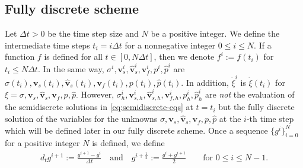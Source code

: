 \documentclass[10pt,letterpaper]{amsart}
\theoremstyle{plain} %
\theoremstyle{remark} %
\newcommand{\vect}[1]{\mathbf{#1}}
\begin{document}
\subsection{Fully discrete scheme}\label{ss:fully_discrete_scheme}
Let $\Delta t>0$ be the time step size and $N$ be a positive integer. We define the intermediate time steps $t_i = i \Delta t$ for a nonnegative integer $0\le i\le N$. If a function $f$ is defined for all $t\in[0,N\Delta t]$, then we denote $f^i:= f(t_i)$ for $t_i \le N\Delta t$. In the same way, $\sigma^{i}, \vect{v}_{s}^{i}, \widehat{\vect{v}}_{s}^{i}, \vect{v}_{f}^{i}, p^{i}, \widehat{p}^{i}$ are $\sigma(t_i), \vect{v}_{s}(t_i), \widehat{\vect{v}}_{s}(t_i), \vect{v}_{f}(t_i), p(t_i), \widehat{p}(t_i)$. In addition, $\dot{\xi}^i$ is $\dot{\xi}(t_i)$ for $\xi = \sigma, \vect{v}_{s}, \widehat{\vect{v}}_{s}, \vect{v}_{f}, p, \widehat{p}$. 
{However, $\sigma_h^{i}, \vect{v}_{s,h}^{i}, \widehat{\vect{v}}_{s,h}^{i}, \vect{v}_{f,h}^{i}, p_h^{i}, \widehat{p}_h^{i}$ are {\it not} the evaluation of the semidiscrete solutions in \eqref{eq:semidiscrete-eqs} at $t=t_i$ but the fully discrete solution of the variables for the unknowns $\sigma, \vect{v}_{s}, \widehat{\vect{v}}_{s}, \vect{v}_{f}, p, \widehat{p}$ at the $i$-th time step which will be defined later in our fully discrete scheme.}
Once a sequence $\{g^i\}_{i=0}^{N}$ for a positive integer $N$ is defined, we define 
%
\begin{align}
	\label{time-quotient}
	d_t g^{i+1} := \frac{g^{i+1} - g^{i}}{\Delta t} \quad \text{and} \quad {g}^{i+\frac 12 } := \frac{g^i + g^{i+1}} 2 \qquad \text{for } 0 \le i \le N-1.
\end{align}
%

\end{document}
